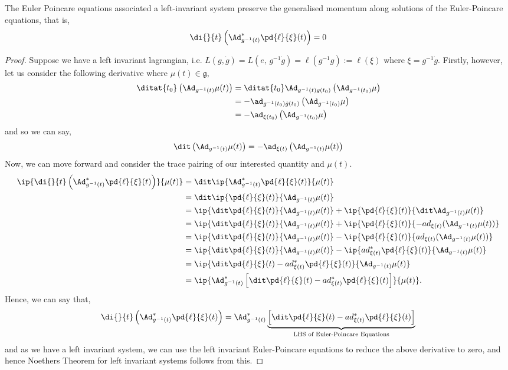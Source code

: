 \begin{nthm}
  The Euler Poincare equations associated a left-invariant system preserve the generalised momentum along solutions of the Euler-Poincare equations, that is,
  $$ \di{}{t} \left(\Ad^*_{g^{-1}(t)}\pd{\ell}{\xi}(t)\right) = 0 $$
\end{nthm}
\begin{proof}
  Suppose we have a left invariant lagrangian, i.e. $L(g, \dot g) = L(e,\,g^{-1}\dot g) = \ell(g^{-1}g) := \ell(\xi)$ where $\xi = g^{-1}\dot g$. Firstly, however, let us consider the following derivative where $\mu(t) \in \mathfrak{g}$,
  \begin{align*}
    \ditat{t_0}\left( \Ad_{g^{-1}(t)}\mu(t) \right) &= \ditat{t_0} \Ad_{g^{-1}(t)g(t_0)}\left( \Ad_{g^{-1}(t_0)} \mu\right)\\
    &= -\ad_{g^{-1}(t_0)\dot g(t_0)} \left( \Ad_{g^{-1}(t_0)} \mu\right)\\
    &= -\ad_{\xi(t_0)} \left( \Ad_{g^{-1}(t_0)} \mu\right)
  \end{align*}
  and so we can say,
  $$ \dit\left( \Ad_{g^{-1}(t)}\mu(t) \right) = -\ad_{\xi(t)} \left( \Ad_{g^{-1}(t)} \mu(t)\right) $$
  Now, we can move forward and consider the trace pairing of our interested quantity and $\mu(t)$.
  \begin{align*}
    \ip{ \di{}{t} \left(\Ad^*_{g^{-1}(t)}\pd{\ell}{\xi}(t)\right) }{ \mu(t) } &= \dit \ip{ \Ad^*_{g^{-1}(t)}\pd{\ell}{\xi}(t) }{ \mu(t) } \\
    &= \dit \ip{ \pd{\ell}{\xi}(t) }{ \Ad_{g^{-1}(t)}\mu(t) } \\
    &=  \ip{ \dit\pd{\ell}{\xi}(t) }{ \Ad_{g^{-1}(t)}\mu(t) } + \ip{ \pd{\ell}{\xi}(t) }{ \dit\Ad_{g^{-1}(t)}\mu(t) } \\
    &=  \ip{ \dit\pd{\ell}{\xi}(t) }{ \Ad_{g^{-1}(t)}\mu(t) } + \ip{ \pd{\ell}{\xi}(t) }{ -ad_{\xi(t)}(\Ad_{g^{-1}(t)}\mu(t)) } \\
    &=  \ip{ \dit\pd{\ell}{\xi}(t) }{ \Ad_{g^{-1}(t)}\mu(t) } - \ip{ \pd{\ell}{\xi}(t) }{ ad_{\xi(t)}(\Ad_{g^{-1}(t)}\mu(t)) } \\
    &=  \ip{ \dit\pd{\ell}{\xi}(t) }{ \Ad_{g^{-1}(t)}\mu(t) } - \ip{ ad^*_{\xi(t)}\pd{\ell}{\xi}(t) }{ \Ad_{g^{-1}(t)}\mu(t) } \\
    &=  \ip{ \dit\pd{\ell}{\xi}(t) - ad^*_{\xi(t)}\pd{\ell}{\xi}(t) }{ \Ad_{g^{-1}(t)}\mu(t) } \\
    &=  \ip{ \Ad^*_{g^{-1}(t)}\left[\dit\pd{\ell}{\xi}(t) - ad^*_{\xi(t)}\pd{\ell}{\xi}(t)\right] }{ \mu(t) }.
  \end{align*}
  Hence, we can say that,
  $$ \di{}{t} \left(\Ad^*_{g^{-1}(t)}\pd{\ell}{\xi}(t)\right) = \Ad^*_{g^{-1}(t)}\underbrace{\left[\dit\pd{\ell}{\xi}(t) - ad^*_{\xi(t)}\pd{\ell}{\xi}(t)\right]}_{\text{LHS of Euler-Poincare Equations}}  $$
  and as we have a left invariant system, we can use the left invariant Euler-Poincare equations to reduce the above derivative to zero, and hence Noethers Theorem for left invariant systems follows from this.
\end{proof}

